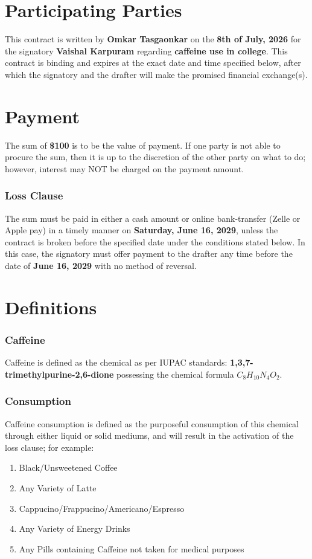 \documentclass{exam}
\author{Omkar Tasgaonkar}
\begin{document}
\thispagestyle{firstpage}

\section{Participating Parties}
This contract is written by \textbf{Omkar Tasgaonkar} on the \textbf{8th of July, 2026} for the signatory \textbf{Vaishal Karpuram} regarding \textbf{caffeine use in college}. This contract is binding and expires at the exact date and time specified below, after which the signatory and the drafter will make the promised financial exchange(s).

\medskip
\section{Payment}
The sum of \textbf{\$100} is to be the value of payment. If one party is not able to procure the sum, then it is up to the discretion of the other party on what to do; however, interest may NOT be charged on the payment amount.

\smallskip
\subsubsection{Loss Clause}
The sum must be paid in either a cash amount or online bank-transfer (Zelle or Apple pay) in a timely manner on \textbf{Saturday, June 16, 2029}, unless the contract is broken before the specified date under the conditions stated below. In this case, the signatory must offer payment to the drafter any time before the date of \textbf{June 16, 2029} with no method of reversal.

\medskip
\section{Definitions}
\subsubsection{Caffeine}
Caffeine is defined as the chemical as per IUPAC standards: \textbf{1,3,7-trimethylpurine-2,6-dione} possessing the chemical formula	
$C_8H_{10}N_4O_2.$

\smallskip
\subsubsection{Consumption}
Caffeine consumption is defined as the purposeful consumption of this chemical through either liquid or solid mediums, and will result in the activation of the loss clause; for example:
\begin{enumerate}
\item Black/Unsweetened Coffee
\item Any Variety of Latte
\item Cappucino/Frappucino/Americano/Espresso
\item Any Variety of Energy Drinks
\item Any Pills containing Caffeine not taken for medical purposes
\end{enumerate}
\end{document}
